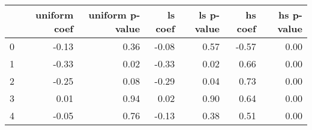 \begin{tabular}{lrrrrrr}
\toprule
 & uniform coef & uniform p-value & ls coef & ls p-value & hs coef & hs p-value \\
\midrule
0 & -0.13 & 0.36 & -0.08 & 0.57 & -0.57 & 0.00 \\
1 & -0.33 & 0.02 & -0.33 & 0.02 & 0.66 & 0.00 \\
2 & -0.25 & 0.08 & -0.29 & 0.04 & 0.73 & 0.00 \\
3 & 0.01 & 0.94 & 0.02 & 0.90 & 0.64 & 0.00 \\
4 & -0.05 & 0.76 & -0.13 & 0.38 & 0.51 & 0.00 \\
\bottomrule
\end{tabular}

